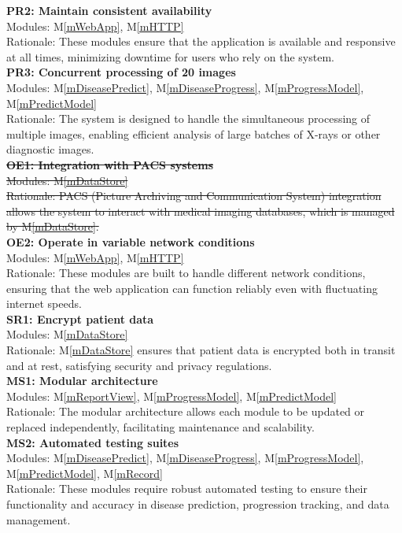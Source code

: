 \documentclass[12pt, titlepage]{article}
\newcommand{\mref}[1]{M\ref{#1}}
\begin{document}
\newline
\textbf{PR2: Maintain consistent availability} \\
Modules: \mref{mWebApp}, \mref{mHTTP} \\
Rationale: These modules ensure that the application is available and responsive at all times, minimizing downtime for users who rely on the system. \\
\newline
\textbf{PR3: Concurrent processing of 20 images} \\
Modules: \mref{mDiseasePredict}, \mref{mDiseaseProgress}, \mref{mProgressModel}, \mref{mPredictModel} \\
Rationale: The system is designed to handle the simultaneous processing of multiple images, enabling efficient analysis of large batches of X-rays or other diagnostic images. \\

\noindent\sout{\textbf{OE1: Integration with PACS systems}} \\
\sout{Modules: \mref{mDataStore}} \\
\sout{Rationale: PACS (Picture Archiving and Communication System) integration allows the system to interact with medical imaging databases, which is managed by \mref{mDataStore}.} \\

\noindent\textbf{OE2: Operate in variable network conditions} \\
Modules: \mref{mWebApp}, \mref{mHTTP} \\
Rationale: These modules are built to handle different network conditions, ensuring that the web application can function reliably even with fluctuating internet speeds. \\
\newline
\textbf{SR1: Encrypt patient data} \\
Modules: \mref{mDataStore} \\
Rationale: \mref{mDataStore} ensures that patient data is encrypted both in transit and at rest, satisfying security and privacy regulations. \\
\newline
\textbf{MS1: Modular architecture} \\
Modules: \mref{mReportView}, \mref{mProgressModel}, \mref{mPredictModel} \\
Rationale: The modular architecture allows each module to be updated or replaced independently, facilitating maintenance and scalability. \\
\newline
\textbf{MS2: Automated testing suites} \\
Modules: \mref{mDiseasePredict}, \mref{mDiseaseProgress}, \mref{mProgressModel}, \mref{mPredictModel}, \mref{mRecord} \\
Rationale: These modules require robust automated testing to ensure their functionality and accuracy in disease prediction, progression tracking, and data management. \\
\end{document}
